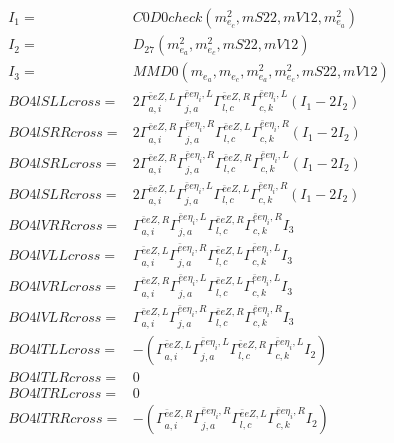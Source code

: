 \documentclass[A4,landscape]{article}
\begin{document}
\begin{align} 
I_1 = & C0D0check(m^2_{e_{{c}}}, mS22, mV12, m^2_{e_{{a}}}) \\ 
I_2 = & D_{27}(m^2_{e_{{a}}}, m^2_{e_{{c}}}, mS22, mV12) \\ 
I_3 = & MMD0(m_{e_{{a}}}, m_{e_{{c}}}, m^2_{e_{{a}}}, m^2_{e_{{c}}}, mS22, mV12) \\ 
  BO4lSLLcross= & 2  \Gamma^{\bar{e}e Z ,L}_{a, i} \Gamma^{\bar{e}e \eta_i ,L}_{j, a} \Gamma^{\bar{e}e Z ,R}_{l, c} \Gamma^{\bar{e}e \eta_i ,L}_{c, k} (I_1 - 2 I_2) \\ 
  BO4lSRRcross= & 2  \Gamma^{\bar{e}e Z ,R}_{a, i} \Gamma^{\bar{e}e \eta_i ,R}_{j, a} \Gamma^{\bar{e}e Z ,L}_{l, c} \Gamma^{\bar{e}e \eta_i ,R}_{c, k} (I_1 - 2 I_2) \\ 
  BO4lSRLcross= & 2  \Gamma^{\bar{e}e Z ,R}_{a, i} \Gamma^{\bar{e}e \eta_i ,R}_{j, a} \Gamma^{\bar{e}e Z ,R}_{l, c} \Gamma^{\bar{e}e \eta_i ,L}_{c, k} (I_1 - 2 I_2) \\ 
  BO4lSLRcross= & 2  \Gamma^{\bar{e}e Z ,L}_{a, i} \Gamma^{\bar{e}e \eta_i ,L}_{j, a} \Gamma^{\bar{e}e Z ,L}_{l, c} \Gamma^{\bar{e}e \eta_i ,R}_{c, k} (I_1 - 2 I_2) \\ 
  BO4lVRRcross= &  \Gamma^{\bar{e}e Z ,R}_{a, i} \Gamma^{\bar{e}e \eta_i ,L}_{j, a} \Gamma^{\bar{e}e Z ,R}_{l, c} \Gamma^{\bar{e}e \eta_i ,R}_{c, k} I_3 \\ 
  BO4lVLLcross= &  \Gamma^{\bar{e}e Z ,L}_{a, i} \Gamma^{\bar{e}e \eta_i ,R}_{j, a} \Gamma^{\bar{e}e Z ,L}_{l, c} \Gamma^{\bar{e}e \eta_i ,L}_{c, k} I_3 \\ 
  BO4lVRLcross= &  \Gamma^{\bar{e}e Z ,R}_{a, i} \Gamma^{\bar{e}e \eta_i ,L}_{j, a} \Gamma^{\bar{e}e Z ,L}_{l, c} \Gamma^{\bar{e}e \eta_i ,L}_{c, k} I_3 \\ 
  BO4lVLRcross= &  \Gamma^{\bar{e}e Z ,L}_{a, i} \Gamma^{\bar{e}e \eta_i ,R}_{j, a} \Gamma^{\bar{e}e Z ,R}_{l, c} \Gamma^{\bar{e}e \eta_i ,R}_{c, k} I_3 \\ 
  BO4lTLLcross= & -( \Gamma^{\bar{e}e Z ,L}_{a, i} \Gamma^{\bar{e}e \eta_i ,L}_{j, a} \Gamma^{\bar{e}e Z ,R}_{l, c} \Gamma^{\bar{e}e \eta_i ,L}_{c, k} I_2) \\ 
  BO4lTLRcross= & 0 \\ 
  BO4lTRLcross= & 0 \\ 
  BO4lTRRcross= & -( \Gamma^{\bar{e}e Z ,R}_{a, i} \Gamma^{\bar{e}e \eta_i ,R}_{j, a} \Gamma^{\bar{e}e Z ,L}_{l, c} \Gamma^{\bar{e}e \eta_i ,R}_{c, k} I_2) \\ 
\end{align} 
\end{document}
